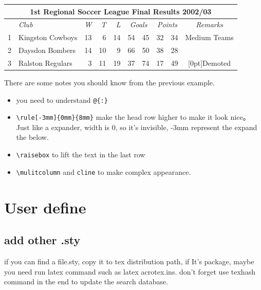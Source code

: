 \documentclass[a4paper,12pt,twoside]{book}
\begin{document}
			\begin{tabular}{|r|l||rrr|r@{:}l|r@{:}l||c|}\hline
			\multicolumn{10}{|c|}{ \rule[-3mm]{0mm}{8mm} \bfseries 1st Regional Soccer League
			Final Results 2002/03}\\ \hline
			&\itshape Club &\itshape W &\itshape T &\itshape L &
			\multicolumn{2}{c|}{\itshape Goals}
			& \multicolumn{2}{c||}{\itshape Points}
			& \itshape Remarks \\ \hline\hline
			
			1& Kingston Cowboys & 13 & 6 & 14 & 54&45 & 32&34 & Medium Teams \\ \hline
			2 & Daysdon Bombers & 14 & 10 & 9 & 66 & 50 & 38 & 28 & \\ \cline{1-9}
			3& Ralston Regulars & 3 & 11 & 19 & 37&74 & 17&49 & \raisebox{1.5ex}[0pt]{Demoted}\\ \hline
			\end{tabular}
			There are some notes you should know from the previous example.
			\begin{itemize}
			\item you need to understand \verb=@{:}=
			\item \verb=\rule[-3mm]{0mm}{8mm}= make the
head row higher to make it look
nice。Just like a expander, width is 0, so it's invisible, -3mm represent the expand the below.

			\item \verb=\raisebox= to lift the text in the last row
			\item \verb=\mulitcolumn= and \verb=cline= to make complex appearance.
			\end{itemize}

\section{User define}
	\subsection{add other .sty}
	if you can find a file.sty, copy it to tex distribution path, if It's package, maybe you need run latex command such as latex acrotex.ins. don't forget use texhash command in the end to update the search database.
	
\end{document}
